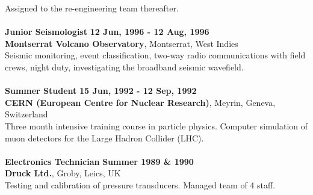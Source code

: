 \documentclass[margin,line]{res}
\begin{document}
\begin{resume}
Assigned to the re-engineering team thereafter.
\\
\hdashline
\\
{\bf Junior Seismologist} \hfill {\bf 12 Jun, 1996 - 12 Aug, 1996}\\
{\bf Montserrat Volcano Observatory}, Montserrat, West Indies \\
Seismic monitoring, event classification, two-way radio communications with field crews, night duty, investigating the broadband seismic wavefield.
\\
\hdashline
\\
{\bf Summer Student} \hfill {\bf 15 Jun, 1992 - 12 Sep, 1992}\\
{\bf CERN (European Centre for Nuclear Research)}, Meyrin, Geneva, Switzerland\\
Three month intensive training course in particle physics. Computer simulation of muon detectors for the Large Hadron Collider (LHC).
\\
\hdashline
\\
{\bf Electronics Technician} \hfill {\bf Summer 1989 \& 1990}\\
{\bf Druck Ltd.}, Groby, Leics, UK\\
Testing and calibration of pressure transducers. Managed team of 4 staff.\\
\\


\end{resume}
\end{document}
